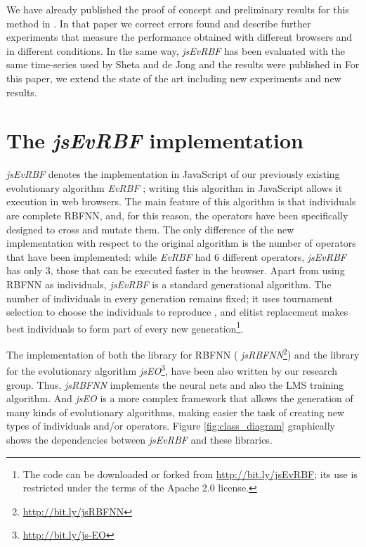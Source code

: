 \documentclass{article}
\begin{document}
We have already published the proof of concept and preliminary results
for this method in \cite{DBLP:conf/dcai/RivasPMAG16}. In that paper we
correct errors found and describe further experiments that measure the
performance obtained with different browsers and in different
conditions. In the same way, {\em jsEvRBF} has been evaluated with the same time-series
used by Sheta and de Jong \cite{Sheta2001} and the results were published in \cite{DBLP:conf/dcai/RivasPMAG16} For this paper, we extend the state of the art including new experiments and new results. %


\section{The {\em jsEvRBF} implementation} %
\label{sec:algorithm}
{\em jsEvRBF} denotes the implementation in JavaScript of our previously existing evolutionary algorithm {\em EvRBF} \cite{rivas03:EvRBF} ; writing this algorithm in JavaScript allows it execution in web browsers.
The main feature of this algorithm is that individuals are complete RBFNN, and, for this reason,
the operators have been specifically designed to cross and mutate them. The only difference of the new implementation with respect to the original algorithm is the number of operators that have been implemented: while {\em EvRBF} had 6 different operators, {\em jsEvRBF} has only 3, those that can be executed faster in the browser.%
Apart from using RBFNN as individuals, {\em jsEvRBF} is a standard generational algorithm. The number of individuals in every generation remains fixed; it uses tournament selection to choose the individuals to reproduce , and elitist replacement  makes best individuals to form part of every new generation\footnote{The code can be downloaded or forked from
  \url{http://bit.ly/jsEvRBF}; its use is restricted under the terms
  of the Apache 2.0 license.}.

The implementation of both the library for RBFNN ( {\em
  jsRBFNN}\footnote{\url{http://bit.ly/jsRBFNN}}) and the library for the evolutionary algorithm  {\em
  jsEO}\footnote{\url{http://bit.ly/js-EO}}, have been also written by
our research group. Thus, {\em jsRBFNN} implements the neural nets and also the LMS
training algorithm. %
And {\em jsEO} \cite{EvoStar2014:jsEO} is a more
complex framework that allows the generation of many kinds of
evolutionary algorithms, making easier the task of creating new types
of individuals and/or operators. Figure \ref{fig:class_diagram}
graphically shows the dependencies between {\em jsEvRBF} and these
libraries.
\end{document}
